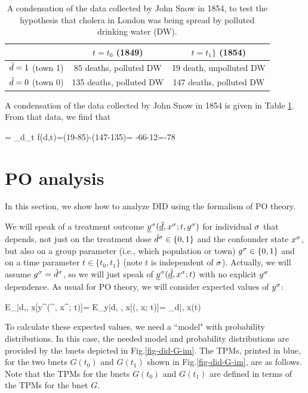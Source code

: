 \begin{table}[h!]
\centering
{\renewcommand{\arraystretch}{1.4}
\begin{tabular}{|c|c|c|}
\hline 
\rowcolor[HTML]{ECF4FF} 
 & $t=t_0 $ (1849) & $t=t_1$$\}$ (1854) \\ 
\hline
${\tilde{d}}=1 $ (town 1)\cellcolor[HTML]{ECF4FF}
&85 deaths, polluted DW&19 death, unpolluted DW\\
\hline 
${\tilde{d}}=0 $ (town 0)\cellcolor[HTML]{ECF4FF} 
&135 deaths, polluted DW& 147 deaths, polluted DW\\ 
\end{tabular}
}
\caption{A condensation of the data
collected by 
John Snow in 1854,
to test the hypothesis
that cholera in London was being spread by
polluted drinking water (DW).}
\label{tab-john-snow}
\end{table}

A condensation of the
data collected by John Snow in 1854
is given in Table \ref{tab-john-snow}.
From that data, we find that

\beq
\delta= \Delta_d\Delta_t f(d,t)=(19-85)-(147-135)=
-66-12=-78
\eeq



\section{PO analysis}
In this section,
we show how
to analyze
DID 
using the formalism of PO theory.

We will speak of a treatment 
outcome
${\underline{y}}^\sigma({\underline{\tilde{d}}}, x^\sigma; t, g^\sigma)$
for individual $\sigma$
that depends, not 
just on the treatment dose ${\tilde{d}}^\sigma\in \{0,1\}$
and the confounder state $x^\sigma$,
but also
on a group parameter (i.e., which population
or town)
$g^\sigma\in \{0,1\}$
and on a time parameter $t\in\{t_0, t_1\}$ 
(note $t$ is independent of $\sigma$).
Actually,
we will assume $g^\sigma={\tilde{d}}^\sigma$,
so we will just speak of
${\underline{y}}^\sigma({\underline{\tilde{d}}}, x^\sigma; t)$
with no explicit $g^\sigma$
dependence. As usual for PO theory,
we will consider
expected values of $y^\sigma$:


\beq
E_{\s|d,\td, x}[y^\s(\td^\s, x^\s; t)]=
 E_{y|d, \td, x}[\rvy(\td, x; t)]=
\caly_{d|\td, x}(t)
\eeq

To calculate these
expected values, we need a ``model"
with probability 
distributions.
In this case,
the needed model and probability
distributions are
provided by the
bnets depicted in Fig.\ref{fig-did-G-im}.
The TPMs,
printed in blue,
for the 
two bnets
$G(t_0)$
and $G(t_1)$ shown
in Fig.\ref{fig-did-G-im},
are as follows.
Note
that the
TPMs for the
bnets $G(t_0)$
and $G(t_1)$
are defined in 
terms
of the TPMs for the bnet $G$.


